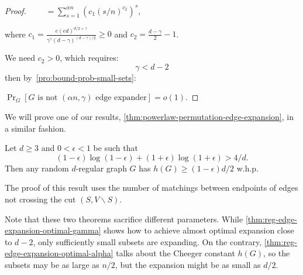 \begin{proof}
    $\qquad=\sum_{s=1}^{\alpha n}{\left(c_1\left(s/n\right)^{c_2}\right)^s}$,
    
    where $c_1=\frac{e(ed)^{d/2+\gamma}}{\gamma^\gamma(d-\gamma)^{(d-\gamma)/2}}\geq 0$
    and $c_2=\frac{d-\gamma}{2}-1$.
    
    We need $c_2>0$, which requires:
    \begin{equation}
        \gamma<d-2
    \end{equation}
    then by~\autoref{pro:bound-prob-small-sets}:
    
    $\Pr_G[G\text{ is not }(\alpha n,\gamma)\text{ edge expander}]=o(1)$.
\end{proof}

We will prove one of our results, \autoref{thm:powerlaw-permutation-edge-expansion}, in a similar fashion.

\begin{theorem}
    \label{thm:reg-edge-expansion-optimal-alpha}
    Let $d\geq3$ and $0<\epsilon<1$ be such that
    \begin{equation}
        \label{eq:bol-eps-req}
        (1-\epsilon)\log{(1-\epsilon)}+(1+\epsilon)\log{(1+\epsilon)}>4/d.
    \end{equation}
    Then any random $d$-regular graph $G$ has $h(G)\geq(1-\epsilon)d/2$ w.h.p.
\end{theorem}

The proof of this result uses the number of matchings
between endpoints of edges not crossing the cut $(S,V\backslash S)$.

Note that these two theorems sacrifice different parameters.
While \autoref{thm:reg-edge-expansion-optimal-gamma} shows how to achieve almost optimal expansion close to $d-2$,
only sufficiently small subsets are expanding.
On the contrary, \autoref{thm:reg-edge-expansion-optimal-alpha} talks about the Cheeger constant $h(G)$,
so the subsets may be as large as $n/2$, but the expansion might be as small as $d/2$.

